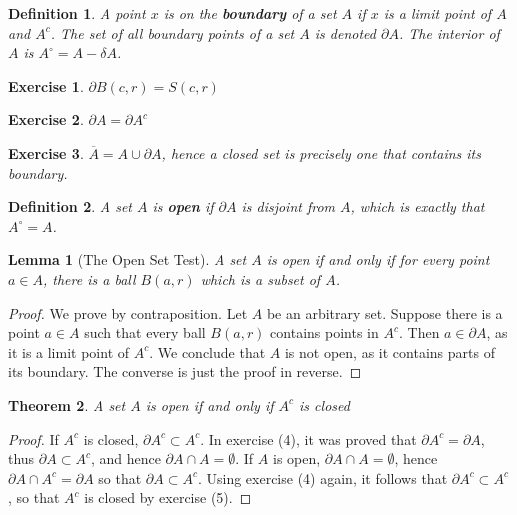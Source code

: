 \documentclass{report}
\newtheorem{theorem}{Theorem}[chapter]
\newtheorem{lemma}[theorem]{Lemma}
\newtheorem{definition}{Definition}
\newtheorem{exercise}{Exercise}
\begin{document}
\begin{definition}
  A point $x$ is on the {\bf boundary} of a set $A$ if $x$ is a limit point of $A$ and $A^c$. The set of all boundary points of a set $A$ is denoted $\partial A$. The interior of $A$ is $A^\circ = A - \delta A$.
\end{definition}

\begin{exercise}
  $\partial B(c,r) = S(c,r)$
\end{exercise}

\begin{exercise}
  $\partial A = \partial A^c$
\end{exercise}

\begin{exercise}
  $\overline{A} = A \cup \partial A$, hence a closed set is precisely one that contains its boundary.
\end{exercise}

\begin{definition}
  A set $A$ is {\bf open} if $\partial A$ is disjoint from $A$, which is exactly that $A^\circ = A$.
\end{definition}

\begin{lemma}[The Open Set Test]
  A set $A$ is open if and only if for every point $a \in A$, there is a ball $B(a,r)$ which is a subset of $A$.
\end{lemma}
\begin{proof}
  We prove by contraposition. Let $A$ be an arbitrary set. Suppose there is a point $a \in A$ such that every ball $B(a,r)$ contains points in $A^c$. Then $a \in \partial A$, as it is a limit point of $A^c$. We conclude that $A$ is not open, as it contains parts of its boundary. The converse is just the proof in reverse.
\end{proof}

\begin{theorem}
  A set $A$ is open if and only if $A^c$ is closed
\end{theorem}
\begin{proof}
  If $A^c$ is closed, $\partial A^c \subset A^c$. In exercise (4), it was proved that $\partial A^c = \partial A$, thus $\partial A \subset A^c$, and hence $\partial A \cap A = \emptyset$. If $A$ is open, $\partial A \cap A = \emptyset$, hence $\partial A \cap A^c = \partial A$ so that $\partial A \subset A^c$. Using exercise (4) again, it follows that $\partial A^c \subset A^c$, so that $A^c$ is closed by exercise (5). 
\end{proof}
\end{document}
